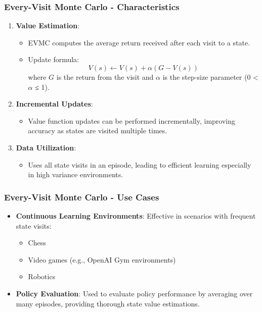 \documentclass[aspectratio=169]{beamer}
\begin{document}
\begin{frame}[fragile]
    \frametitle{Every-Visit Monte Carlo - Characteristics}
    \begin{enumerate}
        \item \textbf{Value Estimation}:
        \begin{itemize}
            \item EVMC computes the average return received after each visit to a state.
            \item Update formula:
            \begin{equation}
                V(s) \leftarrow V(s) + \alpha (G - V(s))
            \end{equation}
            where \( G \) is the return from the visit and \( \alpha \) is the step-size parameter (0 < \( \alpha \) ≤ 1).
        \end{itemize}
        
        \item \textbf{Incremental Updates}:
        \begin{itemize}
            \item Value function updates can be performed incrementally, improving accuracy as states are visited multiple times.
        \end{itemize}
        
        \item \textbf{Data Utilization}:
        \begin{itemize}
            \item Uses all state visits in an episode, leading to efficient learning especially in high variance environments.
        \end{itemize}
    \end{enumerate}
\end{frame}

\begin{frame}[fragile]
    \frametitle{Every-Visit Monte Carlo - Use Cases}
    \begin{itemize}
        \item \textbf{Continuous Learning Environments}: Effective in scenarios with frequent state visits:
        \begin{itemize}
            \item Chess
            \item Video games (e.g., OpenAI Gym environments)
            \item Robotics
        \end{itemize}
        
        \item \textbf{Policy Evaluation}: Used to evaluate policy performance by averaging over many episodes, providing thorough state value estimations.
    \end{itemize}
\end{frame}
\end{document}
